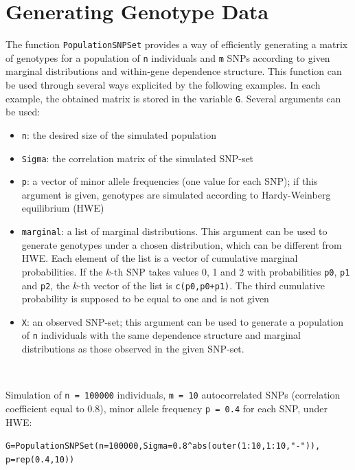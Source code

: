 \documentclass[12pt]{article}
\begin{document}
 	 \section{Generating Genotype Data}

 	 The function \texttt{PopulationSNPSet} provides a way of efficiently generating a matrix of genotypes for a population of \texttt{n} individuals and \texttt{m} SNPs according to given marginal distributions and within-gene dependence structure. This function can be used through several ways explicited by the following examples. In each example, the obtained matrix is stored in the variable \texttt{G}. Several arguments can be used:
 	 \begin{itemize}
 	 	\item \texttt{n}: the desired size of the simulated population
 	 	\item \texttt{Sigma}: the correlation matrix of the simulated SNP-set
 	 	\item \texttt{p}: a vector of minor allele frequencies (one value for each SNP); if this argument is given, genotypes are simulated according to Hardy-Weinberg equilibrium (HWE)
 	 	\item \texttt{marginal}: a list of marginal distributions. This argument can be used to generate genotypes under a chosen distribution, which can be different from HWE. Each element of the list is a vector of cumulative marginal probabilities. If the $k$-th SNP takes values 0, 1 and 2 with probabilities \texttt{p0}, \texttt{p1} and \texttt{p2}, the $k$-th vector of the list is \texttt{c(p0,p0+p1)}. The third cumulative probability is supposed to be equal to one and is not given
 	 	\item \texttt{X}: an observed SNP-set; this argument can be used to generate a population of \texttt{n} individuals with the same dependence structure and marginal distributions as those observed in the given SNP-set.
 	 \end{itemize}

 	 ~

 	 \noindent Simulation of \texttt{n = 100000} individuals, \texttt{m = 10} autocorrelated SNPs (correlation coefficient equal to 0.8), minor allele frequency \texttt{p = 0.4} for each SNP, under HWE:

 	 \begin{alltt}
G = PopulationSNPSet(n=100000,Sigma=0.8\^{}abs(outer(1:10,1:10,"-")),
 \hspace*{1.5em}p=rep(0.4,10))
 	 \end{alltt}
\end{document}
